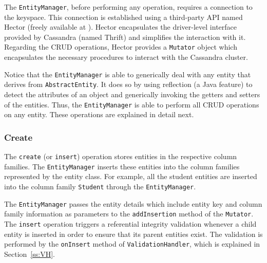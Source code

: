 	The \texttt{EntityManager}, before performing any operation, requires a
	connection to the keyspace. This connection is established using a third-party
	\ac{API} named Hector (freely available at ). Hector
	 encapsulates the driver-level interface provided by Cassandra (named Thrift) 
	 and simplifies the interaction with it. Regarding the \ac{CRUD} 
	 operations, Hector provides  a \texttt{Mutator} object which encapsulates the
	 necessary procedures to interact with the Cassandra cluster.    
	 
	 Notice that  the \texttt{EntityManager} is able to generically deal with any
	 entity that derives from \texttt{AbstractEntity}. It does so by using
	 reflection (a Java  feature) to detect the attributes of an object and
	 generically invoking the getters and setters of the entities. Thus, the
	 \texttt{EntityManager} is able to perform all \ac{CRUD} operations on
	 any entity. These operations are explained in detail next.  
	 
	 
	
	
	
	
	
		\subsubsection{Create}
		 The \texttt{create} (or \texttt{insert}) operation stores entities in the
		 respective column families. The \texttt{EntityManager} inserts these entities
		into the column families represented by the entity class.  
		For example,  all the student entities are inserted into the column family
		\texttt{Student} through the \texttt{EntityManager}. 
		
		The \texttt{EntityManager} passes the entity details which include entity key
		and column family information as parameters to the \texttt{addInsertion}
		method of the \texttt{Mutator}.  The \texttt{insert} operation triggers a
		 referential integrity validation whenever a child entity is  inserted in
		 order to ensure that its parent entities exist. The validation is performed
		 by the \texttt{onInsert} method of \texttt{ValidationHandler}, which is
		explained in Section~\ref{ss:VH}.
	
